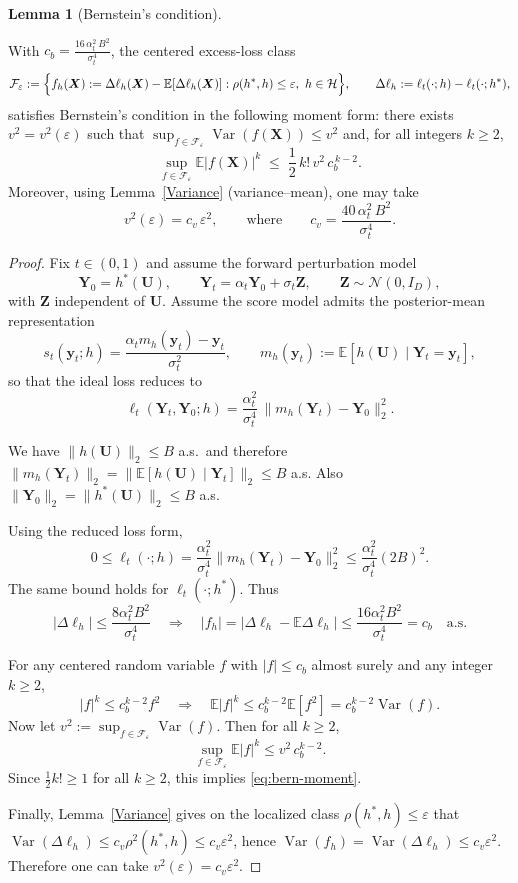 \documentclass[12pt]{article}
\theoremstyle{definition} %
\newtheorem{lemma}{Lemma}
\newcommand{\Var}{\operatorname{Var}}
\newcommand{\X}{\bm X}
\newcommand{\U}{\bm U}
\newcommand{\Y}{\bm Y}
\newcommand{\Z}{\bm Z}
\newcommand{\y}{\bm y}
\providecommand{\E}{\mathbb{E}}
\begin{document}
\begin{lemma}[Bernstein's condition]\label{sub-Gaussian}

With
$c_b=\frac{16\,\alpha_t^2\,B^2}{\sigma_t^4}$,
the centered excess-loss class
\[
\mathcal F_\varepsilon
:=\Bigl\{ f_h(\X):=\Delta\ell_h(\X)-\E[\Delta\ell_h(\X)] : 
\rho(h^*,h)\le \varepsilon,\ h\in\mathcal H\Bigr\},
\qquad
\Delta\ell_h:=\ell_t(\cdot;h)-\ell_t(\cdot;h^*),
\]
satisfies Bernstein's condition in the following moment form:
there exists $v^2=v^2(\varepsilon)$ such that $\sup_{f\in\mathcal F_\varepsilon}\Var(f(\X))\le v^2$ and, for all integers $k\ge 2$,
\begin{equation}\label{eq:bern-moment}
\sup_{f\in\mathcal F_\varepsilon}\E|f(\X)|^k
\;\le\;\frac12\,k!\,v^2\,c_b^{\,k-2}.
\end{equation}
Moreover, using Lemma~\ref{Variance} (variance--mean), one may take
\[
v^2(\varepsilon)=c_v\,\varepsilon^2,
\qquad\text{where}\qquad
c_v=\frac{40\,\alpha_t^2\,B^2}{\sigma_t^4}.
\]
\end{lemma}

\begin{proof}
Fix $t\in(0,1)$ and assume the forward perturbation model
\[
\Y_0=h^*(\U),\qquad \Y_t=\alpha_t \Y_0+\sigma_t \Z,\qquad \Z\sim\mathcal N(0,I_D),
\]
with $\Z$ independent of $\U$. Assume the score model admits the posterior-mean representation
\[
s_t(\y_t;h)=\frac{\alpha_t m_h(\y_t)-\y_t}{\sigma_t^2},\qquad 
m_h(\y_t):=\E[h(\U)\mid \Y_t=\y_t],
\]
so that the ideal loss reduces to
\[
\ell_t(\Y_t,\Y_0;h)=\frac{\alpha_t^2}{\sigma_t^4}\,\|m_h(\Y_t)-\Y_0\|_2^2.
\]


We have $\|h(\U)\|_2\le B$ a.s.\ and therefore $\|m_h(\Y_t)\|_2=\|\E[h(\U)\mid \Y_t]\|_2\le B$ a.s.
Also $\|\Y_0\|_2=\|h^*(\U)\|_2\le B$ a.s.

Using the reduced loss form,
\[
0\le \ell_t(\cdot;h)=\frac{\alpha_t^2}{\sigma_t^4}\|m_h(\Y_t)-\Y_0\|_2^2
\le \frac{\alpha_t^2}{\sigma_t^4}(2B)^2.
\]
The same bound holds for $\ell_t(\cdot;h^*)$. Thus
\[
|\Delta\ell_h|\le \frac{8\alpha_t^2B^2}{\sigma_t^4}
\quad\Rightarrow\quad
|f_h|=|\Delta\ell_h-\E\Delta\ell_h|\le \frac{16\alpha_t^2B^2}{\sigma_t^4}=c_b
\quad\text{a.s.}
\]

For any centered random variable $f$ with $|f|\le c_b$ almost surely and any integer $k\ge 2$,
\[
|f|^k \le c_b^{k-2} f^2
\quad\Rightarrow\quad
\E|f|^k \le c_b^{k-2}\E[f^2]=c_b^{k-2}\Var(f).
\]
Now let $v^2:=\sup_{f\in\mathcal F_\varepsilon}\Var(f)$. Then for all $k\ge 2$,
\[
\sup_{f\in\mathcal F_\varepsilon}\E|f|^k \le v^2\,c_b^{k-2}.
\]
Since $\frac12 k!\ge 1$ for all $k\ge 2$, this implies \eqref{eq:bern-moment}.

Finally, Lemma~\ref{Variance} gives on the localized class $\rho(h^*,h)\le\varepsilon$ that
$\Var(\Delta\ell_h)\le c_v\rho^2(h^*,h)\le c_v\varepsilon^2$, hence
$\Var(f_h)=\Var(\Delta\ell_h)\le c_v\varepsilon^2$. Therefore one can take $v^2(\varepsilon)=c_v\varepsilon^2$.
\end{proof}
\end{document}
